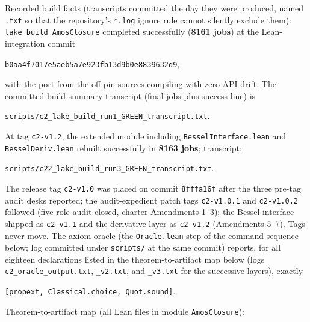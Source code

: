 \documentclass[11pt]{article}
\newcommand{\lean}[1]{\texttt{#1}}
\begin{document}
\medskip
\noindent Recorded build facts (transcripts committed the day they
were produced, named \lean{.txt} so that the repository's
\lean{*.log} ignore rule cannot silently exclude them):
\lean{lake build AmosClosure} completed successfully
(\textbf{8161 jobs}) at the Lean-integration commit
\begin{center}\small
\lean{b0aa4f7017e5aeb5a7e923fb13d9b0e8839632d9},
\end{center}
\noindent with the port from the off-pin sources compiling with zero
API drift.  The committed build-summary transcript (final jobs plus
success line) is
\begin{center}\small
\lean{scripts/c2\_lake\_build\_run1\_GREEN\_transcript.txt}.
\end{center}
\noindent At tag \lean{c2-v1.2}, the extended module including
\lean{BesselInterface.lean} and \lean{BesselDeriv.lean} rebuilt
successfully in \textbf{8163 jobs}; transcript:
\begin{center}\small
\lean{scripts/c22\_lake\_build\_run3\_GREEN\_transcript.txt}.
\end{center}
\noindent The release tag \lean{c2-v1.0} was placed on commit
\lean{8fffa16f} after the three pre-tag audit desks reported; the
audit-expedient patch tags \lean{c2-v1.0.1} and \lean{c2-v1.0.2}
followed (five-role audit closed, charter Amendments 1--3); the
Bessel interface shipped as \lean{c2-v1.1} and the derivative layer
as \lean{c2-v1.2} (Amendments 5--7).  Tags never move.  The axiom oracle (the \lean{Oracle.lean} step of the
command sequence below; log committed under \lean{scripts/} at the
same commit) reports, for all eighteen declarations listed in the
theorem-to-artifact map below (logs \lean{c2\_oracle\_output.txt},
\lean{\_v2.txt}, and \lean{\_v3.txt} for the successive layers),
exactly
\begin{center}
\lean{[propext, Classical.choice, Quot.sound]}.
\end{center}

\medskip
\noindent Theorem-to-artifact map (all Lean files in module
\lean{AmosClosure}):
\end{document}
